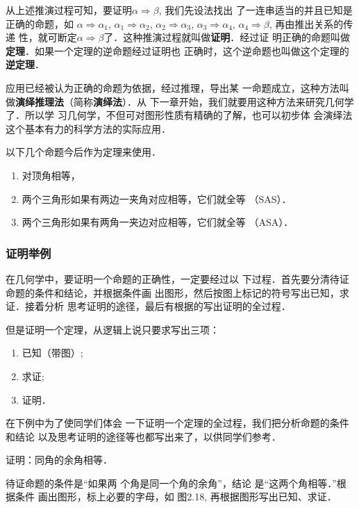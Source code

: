从上述推演过程可知，要证明$\alpha \Rightarrow \beta$, 我们先设法找出
了一连串适当的并且已知是正确的命题，如
$\alpha \Rightarrow \alpha_1$, $\alpha_1\Rightarrow 
\alpha_2$, $\alpha_2\Rightarrow \alpha_3$, $\alpha_3\Rightarrow \alpha_4$, $\alpha_4\Rightarrow \beta$, 再由推出关系的传递
性，就可断定$\alpha \Rightarrow\beta$了．这种推演过程就叫做\textbf{证明}．经过证
明正确的命题叫做\textbf{定理}．如果一个定理的逆命题经过证明也
正确时，这个逆命题也叫做这个定理的\textbf{逆定理}．

应用已经被认为正确的命题为依据，经过推理，导出某
一命题成立，这种方法叫做\textbf{演绎推理法}（简称\textbf{演绎法}）．从
下一章开始，我们就要用这种方法来研究几何学了．所以学
习几何学，不但可对图形性质有精确的了解，也可以初步体
会演绎法这个基本有力的科学方法的实际应用．

以下几个命题今后作为定理来使用．
\begin{enumerate}
	\item 对顶角相等，
	\item 两个三角形如果有两边一夹角对应相等，它们就全等
（SAS）．
\item 两个三角形如果有两角一夹边对应相等，它们就全等
（ASA）．
\end{enumerate}

\subsubsection{证明举例}
在几何学中，要证明一个命题的正确性，一定要经过以
下过程．首先要分清待证命题的条件和结论，并根据条件画
出图形，然后按图上标记的符号写出已知，求证．接着分析
思考证明的途径，最后有根据的写出证明的全过程．

但是证明一个定理，从逻辑上说只要求写出三项：
\begin{multicols}{3}
	\begin{enumerate}
	\item 已知（带图）;
	\item 求证;
	\item 证明．
\end{enumerate}
\end{multicols}

在下例中为了使同学们体会
一下证明一个定理的全过程，我们把分析命题的条件和结论
以及思考证明的途径等也都写出来了，以供同学们参考．

\begin{example}
	证明：同角的余角相等．
	
	待证命题的条件是“如果两
个角是同一个角的余角”，结论
是“这两个角相等．”根据条件
画出图形，标上必要的字母，如
图2.18, 再根据图形写出已知、求证．
\end{example}

